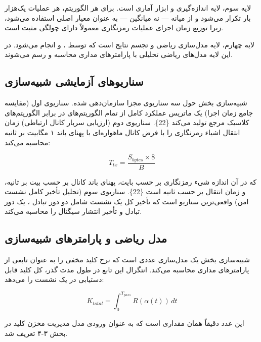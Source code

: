 \documentclass[a4paper,14pt]{extreport}
\begin{document}
لایه سوم، لایه اندازه‌گیری و ابزار آماری است. برای هر الگوریتم، هر عملیات یک‌هزار بار تکرار می‌شود و از میانه  --- نه میانگین  --- به عنوان معیار اصلی استفاده می‌شود، زیرا توزیع زمان اجرای عملیات رمزنگاری معمولاً دارای چولگی مثبت  است.

لایه چهارم، لایه مدل‌سازی ریاضی  و تجسم نتایج است که توسط ،  و  انجام می‌شود. در این لایه مدل‌های ریاضی تحلیلی با پارامترهای مداری محاسبه و رسم می‌شوند.

\subsection{سناریوهای آزمایشی شبیه‌سازی }

شبیه‌سازی بخش  حول سه سناریوی مجزا سازمان‌دهی شده. سناریوی اول (مقایسه جامع زمان اجرا) یک ماتریس عملکرد کامل از تمام الگوریتم‌های  در برابر الگوریتم‌های کلاسیک مرجع تولید می‌کند \{22\}. سناریوی دوم (ارزیابی سربار کانال ارتباطی) زمان انتقال اشیاء رمزنگاری را با فرض کانال  ماهواره‌ای  با پهنای باند ۱ مگابیت بر ثانیه محاسبه می‌کند:

\begin{equation}
T_{tx} = \frac{S_{bytes} \times 8}{B}
\label{eq:ttx}
\end{equation}

که در آن  اندازه شیء رمزنگاری بر حسب بایت،  پهنای باند کانال بر حسب بیت بر ثانیه، و  زمان انتقال بر حسب ثانیه است \{22\}. سناریوی سوم (تحلیل تأخیر کامل نشست امن) واقعی‌ترین سناریو است که تأخیر کل یک نشست شامل دو دور تبادل ، یک دور تبادل  و تأخیر انتشار سیگنال  را محاسبه می‌کند.

\subsection{مدل ریاضی  و پارامترهای شبیه‌سازی}

شبیه‌سازی بخش  یک مدل‌سازی عددی  است که نرخ کلید مخفی را به عنوان تابعی از پارامترهای مداری محاسبه می‌کند. انتگرال این تابع در طول مدت گذر، کل کلید قابل دستیابی در یک نشست را می‌دهد:

\begin{equation}
K_{total} = \int_0^{T_{pass}} R(\alpha(t))\, dt
\label{eq:k_total}
\end{equation}

این عدد دقیقاً همان مقداری است که به عنوان ورودی مدل مدیریت مخزن کلید در بخش ۳-۴ تعریف شد.
\end{document}
